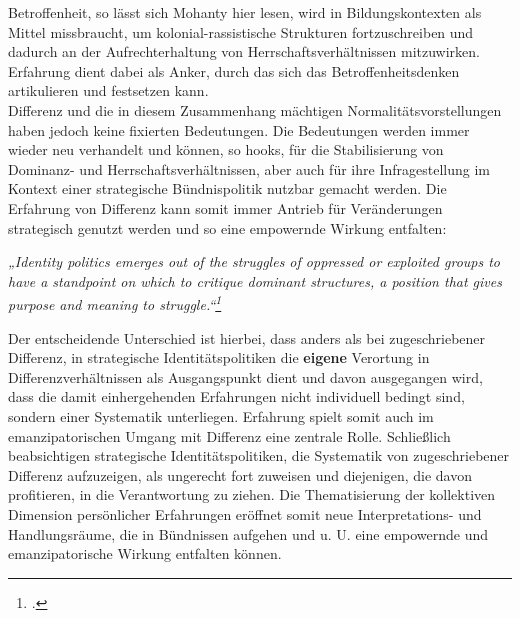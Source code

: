 Betroffenheit, so lässt sich Mohanty hier lesen, wird in Bildungskontexten als
Mittel missbraucht, um kolonial-rassistische Strukturen fortzuschreiben und
dadurch an der Aufrechterhaltung von Herrschaftsverhältnissen mitzuwirken.
Erfahrung dient dabei als Anker, durch das sich das Betroffenheitsdenken
artikulieren und festsetzen kann.
\\

Differenz und die in diesem Zusammenhang mächtigen Normalitätsvorstellungen
haben jedoch keine fixierten Bedeutungen. Die Bedeutungen werden immer wieder
neu verhandelt und können, so hooks, für die Stabilisierung von Dominanz- und
Herrschaftsverhältnissen, aber auch für ihre Infragestellung im Kontext einer
strategische Bündnispolitik nutzbar gemacht werden. Die Erfahrung von Differenz
kann somit immer Antrieb für Veränderungen strategisch genutzt werden und so
eine empowernde Wirkung entfalten:

\begin{myenv}
  \textit{„Identity politics emerges out of the struggles of oppressed or
    exploited groups to have a standpoint on which to critique dominant
    structures, a position that gives purpose and meaning to
    struggle.“\footnotemark \footcitetext[88]{bellhooks}
    }
\end{myenv}

Der entscheidende Unterschied ist hierbei, dass anders als bei zugeschriebener
Differenz, in strategische Identitätspolitiken die \textbf{eigene} Verortung in
Differenzverhältnissen als Ausgangspunkt dient und davon ausgegangen wird, dass
die damit einhergehenden Erfahrungen nicht individuell bedingt sind, sondern
einer Systematik unterliegen. Erfahrung spielt somit auch im emanzipatorischen
Umgang mit Differenz eine zentrale Rolle. Schließlich beabsichtigen
strategische Identitätspolitiken, die Systematik von zugeschriebener Differenz
aufzuzeigen, als ungerecht fort zuweisen und diejenigen, die davon profitieren,
in die Verantwortung zu ziehen. Die Thematisierung der kollektiven Dimension
persönlicher Erfahrungen eröffnet somit neue Interpretations- und
Handlungsräume, die in Bündnissen aufgehen und u. U. eine empowernde und
emanzipatorische Wirkung entfalten können. 
\\

